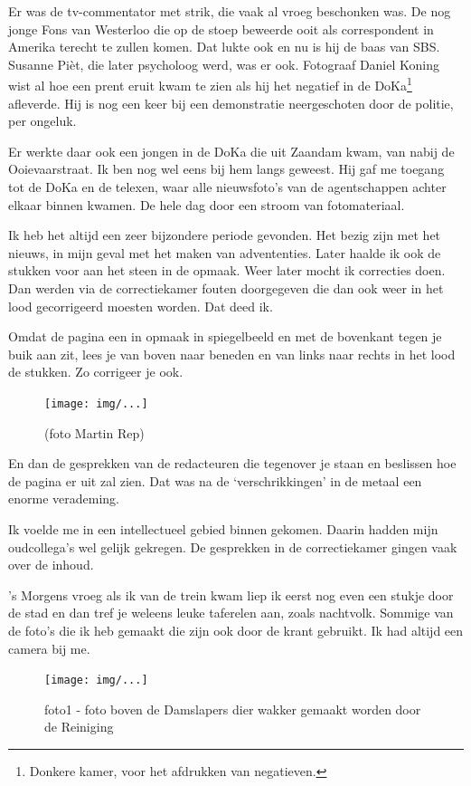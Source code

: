 \documentclass[12pt,twoside, openright]{memoir}
\begin{document}
Er was de tv-commentator met strik, die vaak al vroeg beschonken was. De nog jonge Fons van Westerloo die op de stoep beweerde ooit als correspondent in Amerika terecht te zullen komen. Dat lukte ook en nu is hij de baas van SBS. Susanne Pièt, die later psycholoog werd, was er ook. Fotograaf Daniel Koning wist al hoe een prent eruit kwam te zien als hij het negatief in de DoKa\footnote{Donkere kamer, voor het afdrukken van negatieven.} afleverde. Hij is nog een keer bij een demonstratie neergeschoten door de politie, per ongeluk. 

Er werkte daar ook een jongen in de DoKa die uit Zaandam kwam,  van nabij de Ooievaarstraat. Ik ben nog wel eens bij hem langs geweest. Hij gaf me toegang tot de DoKa en de telexen, waar alle nieuwsfoto’s van de agentschappen achter elkaar binnen kwamen. De hele dag door een stroom van fotomateriaal. 

Ik heb het altijd een zeer bijzondere periode gevonden. Het bezig zijn met het nieuws, in mijn geval met het maken van advententies. Later haalde ik ook de stukken voor aan het steen in de opmaak. Weer later mocht ik correcties doen. Dan werden via de correctiekamer fouten doorgegeven die dan ook weer in het lood gecorrigeerd moesten worden. Dat deed ik. 

Omdat de pagina een in opmaak in spiegelbeeld en met de bovenkant tegen je buik aan zit, lees je van boven naar beneden en van links naar rechts in het lood de stukken. Zo corrigeer je ook. 

\begin{figure}[t]
\texttt{[image: img/...]}
\caption{(foto Martin Rep)}
\end{figure}

En dan de gesprekken van de redacteuren die tegenover je staan en beslissen hoe de pagina er uit zal zien. Dat was na de `verschrikkingen' in de metaal een enorme verademing.

Ik voelde me in een intellectueel gebied binnen gekomen. Daarin hadden mijn oudcollega’s wel gelijk gekregen. De gesprekken in de correctiekamer gingen vaak over de inhoud. 

’s Morgens vroeg als ik van de trein kwam liep ik eerst nog even een stukje door de stad en dan tref je weleens leuke taferelen aan, zoals nachtvolk. Sommige van de foto’s die ik heb gemaakt die zijn ook door de krant gebruikt. Ik had altijd een camera bij me.

\begin{figure}[t]
\texttt{[image: img/...]}
\caption{foto1 - foto boven de Damslapers dier wakker gemaakt worden door de Reiniging}
\end{figure}
\end{document}

